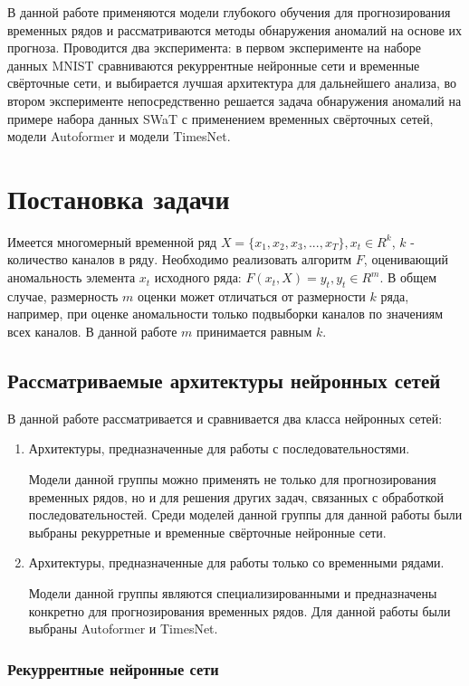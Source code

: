 \documentclass{article}
\begin{document}
В данной работе применяются модели глубокого обучения для прогнозирования временных рядов и рассматриваются методы обнаружения аномалий на основе их прогноза. Проводится два эксперимента: в первом эксперименте на наборе данных MNIST сравниваются рекуррентные нейронные сети и временные свёрточные сети, и выбирается лучшая архитектура для дальнейшего анализа, во втором эксперименте непосредственно решается задача обнаружения аномалий на примере набора данных SWaT с применением временных свёрточных сетей, модели Autoformer и модели TimesNet.
\section{Постановка задачи}
\label{sec:headings}

Имеется многомерный временной ряд $X = \{x_1, x_2, x_3, ..., x_T\}, x_t \in R^k$, $k$ - количество каналов в ряду. Необходимо реализовать алгоритм $F$, оценивающий аномальность элемента $x_t$ исходного ряда: $F(x_t, X) = y_t, y_t \in R^m$. В общем случае, размерность $m$ оценки может отличаться от размерности $k$ ряда, например, при оценке аномальности только подвыборки каналов по значениям всех каналов. В данной работе $m$ принимается равным $k$. 

\subsection{Рассматриваемые архитектуры нейронных сетей}
В данной работе рассматривается и сравнивается два класса нейронных сетей:
\begin{enumerate}
\item Архитектуры, предназначенные для работы с последовательностями. 

Модели данной группы можно применять не только для прогнозирования временных рядов, но и для решения других задач, связанных с обработкой последовательностей. Среди моделей данной группы для данной работы были выбраны рекурретные и временные свёрточные нейронные сети. 

\item Архитектуры, предназначенные для работы только со временными рядами. 

Модели данной группы являются специализированными и предназначены конкретно для прогнозирования временных рядов. Для данной работы были выбраны Autoformer и TimesNet.
\end{enumerate}
\subsubsection{Рекуррентные нейронные сети}
\end{document}
